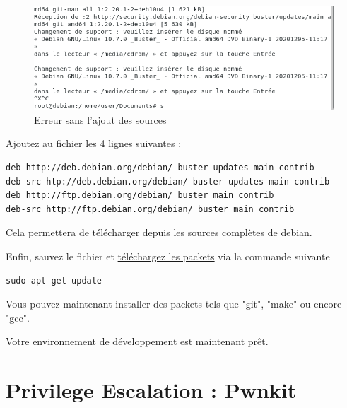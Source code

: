 \documentclass[12pt,a4paper]{article}
\begin{document}
\begin{flushleft}
        \begin{figure}[!h]
         \centering
            \includegraphics[scale=0.6]{cdrom}
            \caption{Erreur sans l'ajout des sources}
        \end{figure}
       \item Ajoutez au fichier les 4 lignes suivantes : 
       \begin{lstlisting}
deb http://deb.debian.org/debian/ buster-updates main contrib
deb-src htp://deb.debian.org/debian/ buster-updates main contrib
deb http://ftp.debian.org/debian/ buster main contrib
deb-src http://ftp.debian.org/debian/ buster main contrib
       \end{lstlisting}
    \item Cela permettera de télécharger depuis les sources complètes de debian. 
    \item Enfin, sauvez le fichier et \underline{téléchargez les packets} via la commande suivante
    \begin{lstlisting}
sudo apt-get update
    \end{lstlisting}
    \item Vous pouvez maintenant installer des packets tels que "git", "make" ou encore "gcc".
    \item Votre environnement de développement est maintenant prêt.
   \end{flushleft}

   \section{Privilege Escalation : Pwnkit}   		
\end{document}
